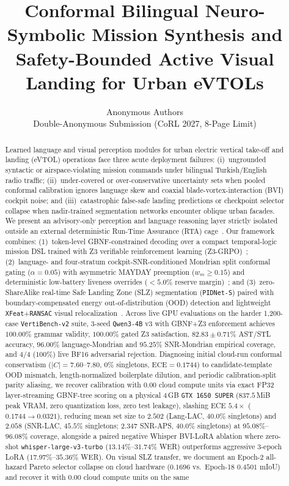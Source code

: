\documentclass[10pt]{article}
\title{Conformal Bilingual Neuro-Symbolic Mission Synthesis and Safety-Bounded Active Visual Landing for Urban eVTOLs}
\author{Anonymous Authors \\
Double-Anonymous Submission (CoRL 2027, 8-Page Limit)}
\date{}
\begin{document}
\maketitle

\begin{abstract}
Learned language and visual perception modules for urban electric vertical take-off and landing (eVTOL) operations face three acute deployment failures: (i)~ungrounded syntactic or airspace-violating mission commands under bilingual Turkish/English radio traffic; (ii)~under-covered or over-conservative uncertainty sets when pooled conformal calibration ignores language skew and coaxial blade-vortex-interaction (BVI) cockpit noise; and (iii)~catastrophic false-safe landing predictions or checkpoint selector collapse when nadir-trained segmentation networks encounter oblique urban facades. We present an advisory-only perception and language reasoning layer strictly isolated outside an external deterministic Run-Time Assurance (RTA) cage~\cite{astm_f3269_2021,anonymous_rta_cage_2026}. Our framework combines: (1)~token-level GBNF-constrained decoding over a compact temporal-logic mission DSL trained with Z3 verifiable reinforcement learning (Z3-GRPO)~\cite{demoura_z3_2008}; (2)~language- and four-stratum cockpit-SNR-conditioned Mondrian split conformal gating ($\alpha=0.05$) with asymmetric MAYDAY preemption ($w_m \ge 0.15$) and deterministic low-battery liveness overrides ($<5.0\%$ reserve margin)~\cite{vovk_conformal_2005,ren_knowno_2023,angelopoulos_gentle_2023}; and (3)~zero-ShareAlike real-time Safe Landing Zone (SLZ) segmentation (\texttt{PIDNet-S}) paired with boundary-compensated energy out-of-distribution (OOD) detection and lightweight \texttt{XFeat}+\texttt{RANSAC} visual relocalization~\cite{xu_pidnet_2023,liu_energy_ood_2020,potje_xfeat_2024,lindenberger_lightglue_2023}. Across live GPU evaluations on the harder 1{,}200-case \texttt{VertiBench-v2} suite, 3-seed \texttt{Qwen3-4B} v3 with GBNF+Z3 enforcement achieves $100.00\%$ grammar validity, $100.00\%$ gated Z3 satisfaction, $82.83 \pm 0.71\%$ AST/STL accuracy, $96.00\%$ language-Mondrian and $95.25\%$ SNR-Mondrian empirical coverage, and $4/4$ ($100\%$) live BF16 adversarial rejection. Diagnosing initial cloud-run conformal conservatism ($|C|=7.60$--$7.80$, $0\%$ singletons, $\text{ECE}=0.1744$) to candidate-template OOD mismatch, length-normalized boilerplate dilution, and periodic calibration-split parity aliasing, we recover calibration with $0.00$ cloud compute units via exact FP32 layer-streaming GBNF-tree scoring on a physical 4\,GB \texttt{GTX~1650~SUPER} ($837.5$\,MiB peak VRAM, zero quantization loss, zero test leakage), slashing ECE $5.4\times$ ($0.1744 \to 0.0321$), reducing mean set size to $2.502$ (Lang-LAC, $40.0\%$ singletons) and $2.058$ (SNR-LAC, $45.5\%$ singletons; $2.347$ SNR-APS, $40.0\%$ singletons) at $95.08\%$--$96.08\%$ coverage, alongside a paired negative Whisper BVI-LoRA ablation where zero-shot \texttt{whisper-large-v3-turbo} ($13.14\%$--$31.74\%$ WER) outperforms aggressive 3-epoch LoRA ($17.97\%$--$35.36\%$ WER). On visual SLZ transfer, we document an Epoch-2 all-hazard Pareto selector collapse on cloud hardware ($0.1696$ vs.\ Epoch-18 $0.4501$ mIoU) and recover it with $0.00$ cloud compute units on the same 
\end{abstract}
\end{document}
